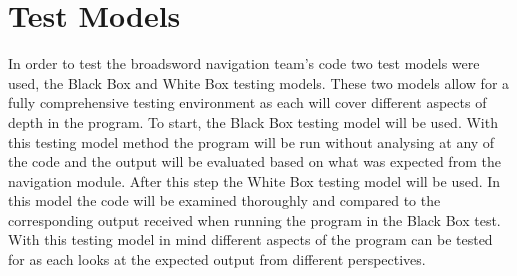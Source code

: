 \section{Test Models}

In order to test the broadsword navigation team’s code two test models were used, the Black Box and White Box testing models.
These two models allow for a fully comprehensive testing environment as each will cover different aspects of depth in the program.
To start, the Black Box testing model will be used. With this testing model method the program will be run without analysing at any of the code
and the output will be evaluated based on what was expected from the navigation module. After this step the White Box testing model will be used.
In this model the code will be examined thoroughly and compared to the corresponding output received when running the program in the Black Box test.
With this testing model in mind different aspects of the program can be tested for as each looks at the expected output from different perspectives.




